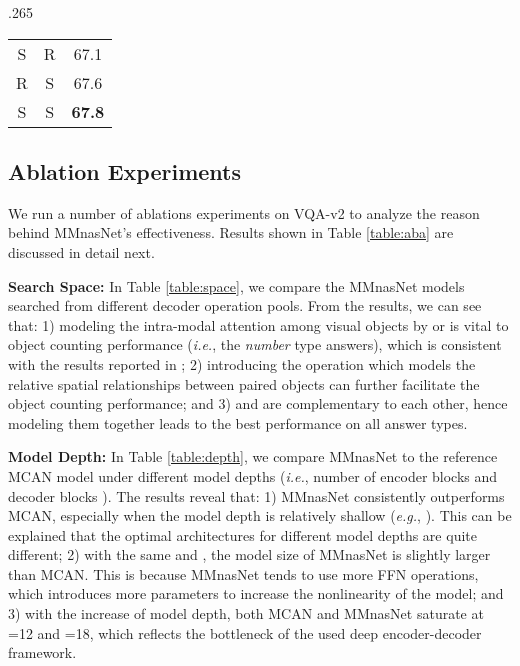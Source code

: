 \documentclass[sigconf]{acmart}
\begin{document}
\begin{table*}
\begin{subtable}[t]{.265\textwidth}
\begin{tabular}{cc|c}
            S & R &  67.1\\
            R & S & 67.6 \\
            S & S & \textbf{67.8} \\
            \bottomrule
        \end{tabular}
        \vspace{5pt}
        \label{table:random}
	\end{subtable}
	\caption{Ablation experiments for MMnasNet on VQA-v2. We train on the \emph{train} split and report the results on the \emph{val} split.}
     \vspace{-5pt}
    \label{table:aba}
\end{table*}

\subsection{Ablation Experiments}
We run a number of ablations experiments on VQA-v2 to analyze the reason behind MMnasNet's effectiveness. Results shown in Table \ref{table:aba} are discussed in detail next.

\noindent\textbf{Search Space:} In Table \ref{table:space}, we compare the MMnasNet models searched from different decoder operation pools. From the results, we can see that: 1) modeling the intra-modal attention among visual objects by  or  is vital to object counting performance (\emph{i.e.}, the \emph{number} type answers), which is consistent with the results reported in \cite{yu2019mcan}; 2) introducing the  operation which models the relative spatial relationships between paired objects can further facilitate the object counting performance; and 3)  and  are complementary to each other, hence modeling them together leads to the best performance on all answer types.

\noindent\textbf{Model Depth:} In Table \ref{table:depth}, we compare MMnasNet to the reference MCAN model \cite{yu2019mcan} under different model depths (\emph{i.e.}, number of encoder blocks  and decoder blocks ). The results reveal that: 1) MMnasNet consistently outperforms MCAN, especially when the model depth is relatively shallow (\emph{e.g.}, ). This can be explained that the optimal architectures for different model depths are quite different; 2) with the same  and , the model size of MMnasNet is slightly larger than MCAN. This is because MMnasNet tends to use more \textsf{FFN} operations, which introduces more parameters to increase the nonlinearity of the model; and 3) with the increase of model depth, both MCAN and MMnasNet saturate at =12 and =18, which reflects the bottleneck of the used deep encoder-decoder framework.
\end{document}
